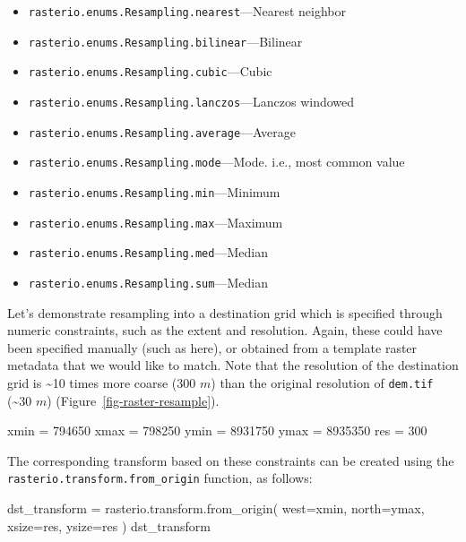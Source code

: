 \documentclass[
  letterpaper,
]{krantz}
\newenvironment{Shaded}{\begin{snugshade}}{\end{snugshade}}
\newcommand{\DecValTok}[1]{\textcolor[rgb]{0.68,0.00,0.00}{#1}}
\newcommand{\NormalTok}[1]{\textcolor[rgb]{0.00,0.23,0.31}{#1}}
\newcommand{\OperatorTok}[1]{\textcolor[rgb]{0.37,0.37,0.37}{#1}}
\providecommand{\tightlist}{%
  \setlength{\itemsep}{0pt}\setlength{\parskip}{0pt}}\usepackage{longtable,booktabs,array}
\begin{document}
\begin{itemize}
\tightlist
\item
  \texttt{rasterio.enums.Resampling.nearest}---Nearest neighbor
\item
  \texttt{rasterio.enums.Resampling.bilinear}---Bilinear
\item
  \texttt{rasterio.enums.Resampling.cubic}---Cubic
\item
  \texttt{rasterio.enums.Resampling.lanczos}---Lanczos windowed
\item
  \texttt{rasterio.enums.Resampling.average}---Average
\item
  \texttt{rasterio.enums.Resampling.mode}---Mode. i.e., most common
  value
\item
  \texttt{rasterio.enums.Resampling.min}---Minimum
\item
  \texttt{rasterio.enums.Resampling.max}---Maximum
\item
  \texttt{rasterio.enums.Resampling.med}---Median
\item
  \texttt{rasterio.enums.Resampling.sum}---Median
\end{itemize}

Let's demonstrate resampling into a destination grid which is specified
through numeric constraints, such as the extent and resolution. Again,
these could have been specified manually (such as here), or obtained
from a template raster metadata that we would like to match. Note that
the resolution of the destination grid is \textasciitilde10 times more
coarse (300 \(m\)) than the original resolution of \texttt{dem.tif}
(\textasciitilde30 \(m\)) (Figure~\ref{fig-raster-resample}).

\begin{Shaded}
\begin{Highlighting}[]
\NormalTok{xmin }\OperatorTok{=} \DecValTok{794650}
\NormalTok{xmax }\OperatorTok{=} \DecValTok{798250}
\NormalTok{ymin }\OperatorTok{=} \DecValTok{8931750} 
\NormalTok{ymax }\OperatorTok{=} \DecValTok{8935350}
\NormalTok{res }\OperatorTok{=} \DecValTok{300}
\end{Highlighting}
\end{Shaded}

The corresponding transform based on these constraints can be created
using the \texttt{rasterio.transform.from\_origin} function, as follows:

\begin{Shaded}
\begin{Highlighting}[]
\NormalTok{dst\_transform }\OperatorTok{=}\NormalTok{ rasterio.transform.from\_origin(}
\NormalTok{    west}\OperatorTok{=}\NormalTok{xmin, }
\NormalTok{    north}\OperatorTok{=}\NormalTok{ymax, }
\NormalTok{    xsize}\OperatorTok{=}\NormalTok{res, }
\NormalTok{    ysize}\OperatorTok{=}\NormalTok{res}
\NormalTok{)}
\NormalTok{dst\_transform}
\end{Highlighting}
\end{Shaded}
\end{document}
